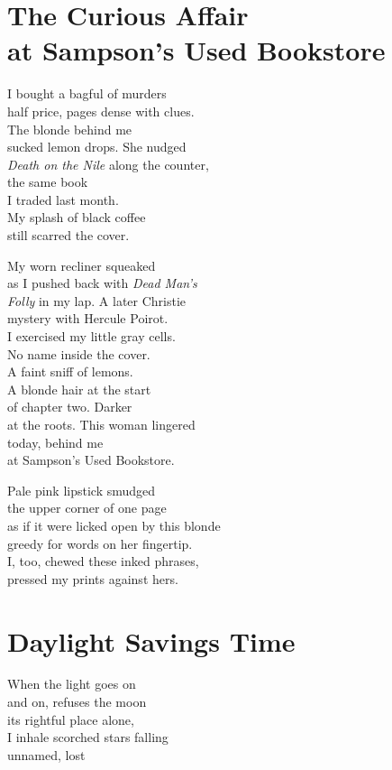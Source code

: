 \documentclass[twoside,10pt]{book}
\begin{document}
\clearpage
\section{The Curious Affair\\ at Sampson's Used Bookstore}

I bought a bagful of murders\\
half price, pages dense with clues.\\
The blonde behind me\\
sucked lemon drops. She nudged\\
\emph{Death on the Nile} along the counter,\\
the same book\\
I traded last month.\\
My splash of black coffee\\
still scarred the cover.

My worn recliner squeaked\\
as I pushed back with \emph{Dead Man's\\
Folly} in my lap. A later Christie\\
mystery with Hercule Poirot.\\
I exercised my little gray cells.\\
No name inside the cover.\\
A faint sniff of lemons.\\
A blonde hair at the start\\
of chapter two. Darker\\
at the roots. This woman lingered\\
today, behind me\\
at Sampson's Used Bookstore.

Pale pink lipstick smudged\\
the upper corner of one page\\
as if it were licked open by this blonde\\
greedy for words on her fingertip.\\
I, too, chewed these inked phrases,\\
pressed my prints against hers.


\clearpage
\section{Daylight Savings Time}

When the light goes on\\
and on, refuses the moon\\
its rightful place alone,\\
I inhale scorched stars falling\\
unnamed, lost
\end{document}
